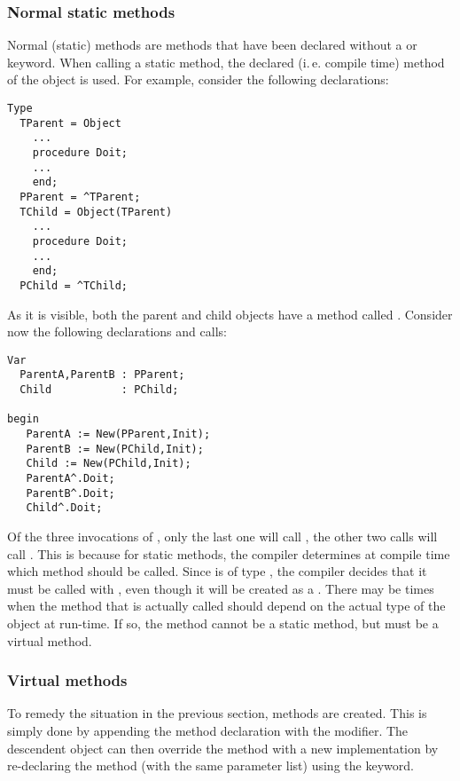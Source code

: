 \subsubsection{Normal static methods}
Normal (static) methods are methods that have been declared without a 
or  keyword. When calling a static method, the declared (i.\,e.
compile time) method of the object is used.
For example, consider the following declarations:
\begin{verbatim}
Type
  TParent = Object
    ...
    procedure Doit;
    ...
    end;
  PParent = ^TParent;
  TChild = Object(TParent)
    ...
    procedure Doit;
    ...
    end;
  PChild = ^TChild;
\end{verbatim}
As it is visible, both the parent and child objects have a method called
. Consider now the following declarations and calls:
\begin{verbatim}
Var
  ParentA,ParentB : PParent;
  Child           : PChild;

begin
   ParentA := New(PParent,Init);
   ParentB := New(PChild,Init);
   Child := New(PChild,Init);
   ParentA^.Doit;
   ParentB^.Doit;
   Child^.Doit;
\end{verbatim}
Of the three invocations of , only the last one will call
, the other two calls will call .
This is because for static methods, the compiler determines at compile
time which method should be called. Since  is of type
, the compiler decides that it must be called with
, even though it will be created as a .
There may be times when the method that is actually called should
depend on the actual type of the object at run-time. If so, the method
cannot be a static method, but must be a virtual method.

\subsubsection{Virtual methods}
To remedy the situation in the previous section,  methods are
created. This is simply done by appending the method declaration with the
 modifier. The descendent object can then override the method
with a new implementation by re-declaring the method (with the same
parameter list) using the  keyword.

